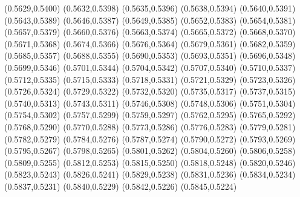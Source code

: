 \PST@Filltriangle(0.5629,0.5400)
\PST@Filltriangle(0.5632,0.5398)
\PST@Filltriangle(0.5635,0.5396)
\PST@Filltriangle(0.5638,0.5394)
\PST@Filltriangle(0.5640,0.5391)
\PST@Filltriangle(0.5643,0.5389)
\PST@Filltriangle(0.5646,0.5387)
\PST@Filltriangle(0.5649,0.5385)
\PST@Filltriangle(0.5652,0.5383)
\PST@Filltriangle(0.5654,0.5381)
\PST@Filltriangle(0.5657,0.5379)
\PST@Filltriangle(0.5660,0.5376)
\PST@Filltriangle(0.5663,0.5374)
\PST@Filltriangle(0.5665,0.5372)
\PST@Filltriangle(0.5668,0.5370)
\PST@Filltriangle(0.5671,0.5368)
\PST@Filltriangle(0.5674,0.5366)
\PST@Filltriangle(0.5676,0.5364)
\PST@Filltriangle(0.5679,0.5361)
\PST@Filltriangle(0.5682,0.5359)
\PST@Filltriangle(0.5685,0.5357)
\PST@Filltriangle(0.5688,0.5355)
\PST@Filltriangle(0.5690,0.5353)
\PST@Filltriangle(0.5693,0.5351)
\PST@Filltriangle(0.5696,0.5348)
\PST@Filltriangle(0.5699,0.5346)
\PST@Filltriangle(0.5701,0.5344)
\PST@Filltriangle(0.5704,0.5342)
\PST@Filltriangle(0.5707,0.5340)
\PST@Filltriangle(0.5710,0.5337)
\PST@Filltriangle(0.5712,0.5335)
\PST@Filltriangle(0.5715,0.5333)
\PST@Filltriangle(0.5718,0.5331)
\PST@Filltriangle(0.5721,0.5329)
\PST@Filltriangle(0.5723,0.5326)
\PST@Filltriangle(0.5726,0.5324)
\PST@Filltriangle(0.5729,0.5322)
\PST@Filltriangle(0.5732,0.5320)
\PST@Filltriangle(0.5735,0.5317)
\PST@Filltriangle(0.5737,0.5315)
\PST@Filltriangle(0.5740,0.5313)
\PST@Filltriangle(0.5743,0.5311)
\PST@Filltriangle(0.5746,0.5308)
\PST@Filltriangle(0.5748,0.5306)
\PST@Filltriangle(0.5751,0.5304)
\PST@Filltriangle(0.5754,0.5302)
\PST@Filltriangle(0.5757,0.5299)
\PST@Filltriangle(0.5759,0.5297)
\PST@Filltriangle(0.5762,0.5295)
\PST@Filltriangle(0.5765,0.5292)
\PST@Filltriangle(0.5768,0.5290)
\PST@Filltriangle(0.5770,0.5288)
\PST@Filltriangle(0.5773,0.5286)
\PST@Filltriangle(0.5776,0.5283)
\PST@Filltriangle(0.5779,0.5281)
\PST@Filltriangle(0.5782,0.5279)
\PST@Filltriangle(0.5784,0.5276)
\PST@Filltriangle(0.5787,0.5274)
\PST@Filltriangle(0.5790,0.5272)
\PST@Filltriangle(0.5793,0.5269)
\PST@Filltriangle(0.5795,0.5267)
\PST@Filltriangle(0.5798,0.5265)
\PST@Filltriangle(0.5801,0.5262)
\PST@Filltriangle(0.5804,0.5260)
\PST@Filltriangle(0.5806,0.5258)
\PST@Filltriangle(0.5809,0.5255)
\PST@Filltriangle(0.5812,0.5253)
\PST@Filltriangle(0.5815,0.5250)
\PST@Filltriangle(0.5818,0.5248)
\PST@Filltriangle(0.5820,0.5246)
\PST@Filltriangle(0.5823,0.5243)
\PST@Filltriangle(0.5826,0.5241)
\PST@Filltriangle(0.5829,0.5238)
\PST@Filltriangle(0.5831,0.5236)
\PST@Filltriangle(0.5834,0.5234)
\PST@Filltriangle(0.5837,0.5231)
\PST@Filltriangle(0.5840,0.5229)
\PST@Filltriangle(0.5842,0.5226)
\PST@Filltriangle(0.5845,0.5224)

